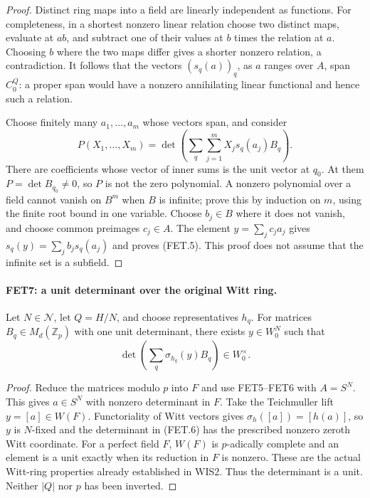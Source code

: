 \begin{proof}
Distinct ring maps into a field are linearly independent as
functions. For completeness, in a shortest nonzero linear relation
choose two distinct maps, evaluate at $ab$, and subtract one of
their values at $b$ times the relation at $a$. Choosing $b$ where
the two maps differ gives a shorter nonzero relation, a contradiction.
It follows that the vectors $(s_q(a))_q$, as $a$ ranges over $A$,
span $C_0^Q$: a proper span would have a nonzero annihilating
linear functional and hence such a relation.

Choose finitely many $a_1,\ldots,a_m$ whose vectors span, and
consider
\[
 P(X_1,\ldots,X_m)=
 \det\left(\sum_q\sum_{j=1}^m X_j s_q(a_j)B_q\right).
\]
There are coefficients whose vector of inner sums is the unit
vector at $q_0$. At them $P=\det B_{q_0}\ne0$, so $P$ is not
the zero polynomial. A nonzero polynomial over a field cannot
vanish on $B^m$ when $B$ is infinite; prove this by induction
on $m$, using the finite root bound in one variable.
Choose $b_j\in B$ where it does not vanish, and choose common
preimages $c_j\in A$. The element $y=\sum_j c_j a_j$ gives
$s_q(y)=\sum_j b_j s_q(a_j)$ and proves (FET.5).
This proof does not assume that the infinite set is a subfield.
\end{proof}

\paragraph{FET7: a unit determinant over the original Witt ring.}
\label{claim:FET7}
Let $N\in\mathcal N$, let $Q=H/N$, and choose representatives
$h_q$. For matrices $B_q\in M_d(\mathbb Z_p)$ with one unit
determinant, there exists $y\in W_0^N$ such that
\[
                  \det\left(\sum_q\sigma_{h_q}(y)B_q\right)
                        \in W_0^\times.                  \tag{FET.6}
\]

\begin{proof}
Reduce the matrices modulo $p$ into $F$ and use FET5--FET6
with $A=S^N$. This gives $a\in S^N$ with nonzero determinant
in $F$. Take the Teichmuller lift $y=[a]\in W(F)$.
Functoriality of Witt vectors gives
$\sigma_h([a])=[h(a)]$, so $y$ is $N$-fixed and the determinant
in (FET.6) has the prescribed nonzero zeroth Witt coordinate.
For a perfect field $F$, $W(F)$ is $p$-adically complete and an
element is a unit exactly when its reduction in $F$ is nonzero.
These are the actual Witt-ring properties already established in
WIS2. Thus the determinant is a unit. Neither $|Q|$ nor $p$
has been inverted.
\end{proof}

